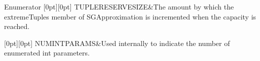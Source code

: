 \begin{DoxyEnumFields}{Enumerator}
[0pt][0pt]{}\mbox{\label{namespaceSG_a031898e6fc0fa14d8590f85da9715f37a4a8ef477625ba609140795f362b09a8b}} 
T\+U\+P\+L\+E\+R\+E\+S\+E\+R\+V\+E\+S\+I\+ZE&The amount by which the extreme\+Tuples member of S\+G\+Approximation is incremented when the capacity is reached. \\
\hline

[0pt][0pt]{}\mbox{\label{namespaceSG_a031898e6fc0fa14d8590f85da9715f37a783be7f32402b1402939255426796f7c}} 
N\+U\+M\+I\+N\+T\+P\+A\+R\+A\+MS&Used internally to indicate the number of enumerated int parameters. \\
\hline

\end{DoxyEnumFields}
